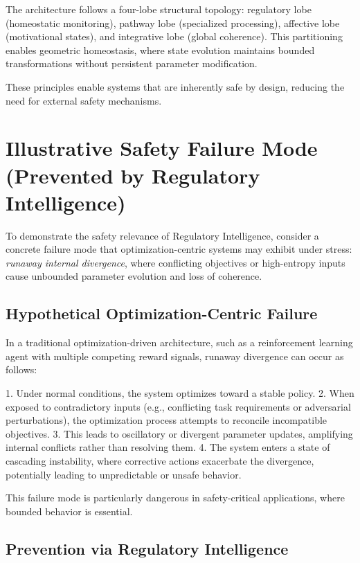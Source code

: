 \documentclass[12pt,a4paper]{report}
\begin{document}
The architecture follows a four-lobe structural topology: regulatory lobe (homeostatic monitoring), pathway lobe (specialized processing), affective lobe (motivational states), and integrative lobe (global coherence). This partitioning enables geometric homeostasis, where state evolution maintains bounded transformations without persistent parameter modification.

These principles enable systems that are inherently safe by design, reducing the need for external safety mechanisms.

\section{Illustrative Safety Failure Mode (Prevented by Regulatory Intelligence)}

To demonstrate the safety relevance of Regulatory Intelligence, consider a concrete failure mode that optimization-centric systems may exhibit under stress: \emph{runaway internal divergence}, where conflicting objectives or high-entropy inputs cause unbounded parameter evolution and loss of coherence.

\subsection{Hypothetical Optimization-Centric Failure}

In a traditional optimization-driven architecture, such as a reinforcement learning agent with multiple competing reward signals, runaway divergence can occur as follows:

1. Under normal conditions, the system optimizes toward a stable policy.
2. When exposed to contradictory inputs (e.g., conflicting task requirements or adversarial perturbations), the optimization process attempts to reconcile incompatible objectives.
3. This leads to oscillatory or divergent parameter updates, amplifying internal conflicts rather than resolving them.
4. The system enters a state of cascading instability, where corrective actions exacerbate the divergence, potentially leading to unpredictable or unsafe behavior.

This failure mode is particularly dangerous in safety-critical applications, where bounded behavior is essential.

\subsection{Prevention via Regulatory Intelligence}
\end{document}
